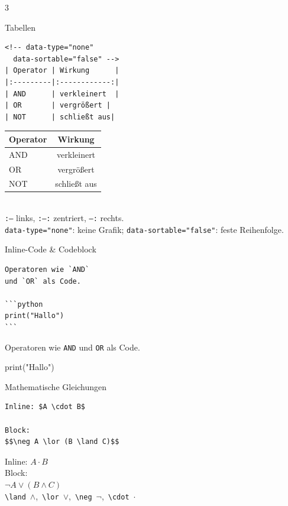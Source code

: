 \documentclass[a4paper,landscape,9pt]{extarticle}
\newcommand{\prevtxt}[1]{{\small #1}}
\begin{document}
\begin{multicols}{3}

\begin{mdcard}{Tabellen}
\begin{lstlisting}[language=lia]
<!-- data-type="none"
  data-sortable="false" -->
| Operator | Wirkung      |
|:---------|:------------:|
| AND      | verkleinert  |
| OR       | vergrößert |
| NOT      | schließt aus|
\end{lstlisting}
\tcblower
\prevtxt{%
\renewcommand{\arraystretch}{1.05}%
\begin{tabular}{|l|c|}\hline
\textbf{Operator} & \textbf{Wirkung}\\\hline
AND & verkleinert\\
OR  & vergrößert\\
NOT & schließt aus\\\hline
\end{tabular}\\[2pt]
{\scriptsize\color{muted}\texttt{:--} links, \texttt{:--:} zentriert, \texttt{--:} rechts.\\
\texttt{data-type="none"}: keine Grafik; \texttt{data-sortable="false"}: feste Reihenfolge.}}
\end{mdcard}

\begin{mdcard}{Inline-Code \& Codeblock}
\begin{lstlisting}[language=lia]
Operatoren wie `AND`
und `OR` als Code.

```python
print("Hallo")
```
\end{lstlisting}
\tcblower
\prevtxt{Operatoren wie \texttt{\small AND}
und \texttt{\small OR} als Code.\\[3pt]
\colorbox{codebg}{\parbox{0.85\linewidth}{\ttfamily\scriptsize print("Hallo")}}}
\end{mdcard}

\begin{mdcard}{Mathematische Gleichungen}
\begin{lstlisting}[language=lia]
Inline: $A \cdot B$

Block:
$$\neg A \lor (B \land C)$$
\end{lstlisting}
\tcblower
\prevtxt{Inline: $A \cdot B$\\[3pt]
Block:\\
$\displaystyle \neg A \lor (B \land C)$\\[3pt]
{\scriptsize\color{muted}\texttt{\textbackslash land}~$\land$,\,
\texttt{\textbackslash lor}~$\lor$,\,
\texttt{\textbackslash neg}~$\neg$,\,
\texttt{\textbackslash cdot}~$\cdot$}}
\end{mdcard}


\end{multicols}
\end{document}
